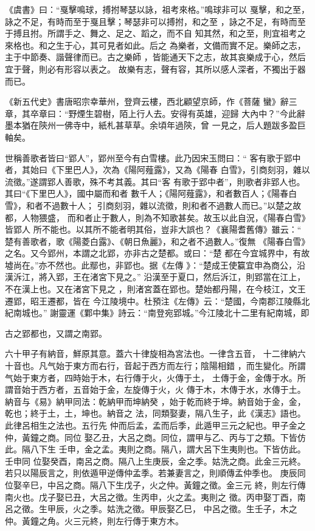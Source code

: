 \documentclass{ctexart}
\begin{document}
《虞書》曰：``戛擊鳴球，搏拊琴瑟以詠，祖考來格。''鳴球非可以 戛擊，和之至，詠之不足，有時而至于戛且擊；琴瑟非可以搏拊，和之至 ，詠之不足，有時而至于搏且拊。所謂手之、舞之、足之、蹈之，而不自 知其然，和之至，則宜祖考之來格也。和之生于心，其可見者如此。后之 為樂者，文備而實不足。樂師之志，主于中節奏、諧聲律而已。古之樂師 ，皆能通天下之志，故其哀樂成于心，然后宜于聲，則必有形容以表之。 故樂有志，聲有容，其所以感人深者，不獨出于器而已。

《新五代史》書唐昭宗幸華州，登齊云樓，西北顧望京師，作《菩薩 蠻》辭三章，其卒章曰：``野煙生碧樹，陌上行人去。安得有英雄，迎歸 大內中？''今此辭墨本猶在陝州一佛寺中，紙札甚草草。余頃年過陝，曾 一見之，后人題跋多盈巨軸矣。

世稱善歌者皆曰``郢人''，郢州至今有白雪樓。此乃因宋玉問曰：`` 客有歌于郢中者，其始曰《下里巴人》，次為《陽阿薤露》，又為《陽春 白雪》，引商刻羽，雜以流徵。''遂謂郢人善歌，殊不考其義。其曰``客 有歌于郢中者''，則歌者非郢人也。其曰``《下里巴人》，國中屬而和者 數千人；《陽阿薤露》，和者數百人；《陽春白雪》，和者不過數十人； 引商刻羽，雜以流徵，則和者不過數人而已。''以楚之故都，人物猥盛， 而和者止于數人，則為不知歌甚矣。故玉以此自況，《陽春白雪》皆郢人 所不能也。以其所不能者明其俗，豈非大誤也？《襄陽耆舊傳》雖云：`` 楚有善歌者，歌《陽菱白露》、《朝日魚麗》，和之者不過數人。''復無 《陽春白雪》之名。又今郢州，本謂之北郢，亦非古之楚都。或曰：``楚 都在今宜城界中，有故墟尚在。''亦不然也。此鄢也，非郢也。据《左傳 》：``楚成王使籯宜申為商公，沿漢泝江，將入郢，王在渚宮下見之。'' 沿漢至于夏口，然后泝江，則郢當在江上，不在漢上也。又在渚宮下見之 ，則渚宮蓋在郢也。楚始都丹陽，在今枝江，文王遷郢，昭王遷都，皆在 今江陵境中。杜預注《左傳》云：``楚國，今南郡江陵縣北紀南城也。'' 謝靈運《鄴中集》詩云：``南登宛郢城。''今江陵北十二里有紀南城，即

古之郢都也，又謂之南郢。

六十甲子有納音，鮮原其意。蓋六十律旋相為宮法也。一律含五音， 十二律納六十音也。凡气始于東方而右行，音起于西方而左行；陰陽相錯 ，而生變化。所謂气始于東方者，四時始于木，右行傳于火，火傳于土， 土傳于金，金傳于水。所謂音始于西方者，五音始于金，左旋傳于火，火 傳于木，木傳于水，水傳于土。納音与《易》納甲同法：乾納甲而坤納癸 ，始于乾而終于坤。納音始于金，金，乾也；終于土，土，坤也。納音之 法，同類娶妻，隔八生子，此《漢志》語也。此律呂相生之法也。五行先 仲而后孟，孟而后季，此遁甲三元之紀也。甲子金之仲，黃鐘之商。同位 娶乙丑，大呂之商。同位，謂甲与乙、丙与丁之類。下皆仿此。隔八下生 壬申，金之孟。夷則之商。隔八，謂大呂下生夷則也。下皆仿此。壬申同 位娶癸酉，南呂之商。隔八上生庚辰，金之季。姑洗之商。此金三元終。 若只以陽辰言之，則依遁甲逆傳仲孟季。若兼妻言之，則順傳孟仲季也。 庚辰同位娶辛巳，中呂之商。隔八下生戊子，火之仲。黃鐘之徵。金三元 終，則左行傳南火也。戊子娶已丑，大呂之徵。生丙申，火之孟。夷則之 徵。丙申娶丁酉，南呂之徵。生甲辰，火之季。姑洗之徵。甲辰娶乙巳， 中呂之徵。生壬子，木之仲。黃鐘之角。火三元終，則左行傳于東方木。
\end{document}
